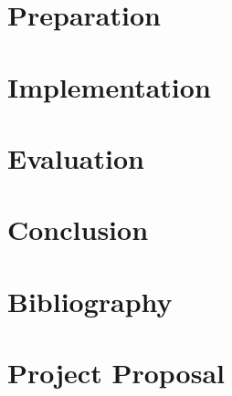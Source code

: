 \documentclass[12pt,twoside,notitlepage]{report}
\newcommand{\texas}{Texas Hold~`em\xspace}
\newcommand{\texasp}{\texas Poker\xspace}
\newcommand{\sbt}{SimpleBot\xspace}
\begin{document}
\cleardoublepage
\chapter{Preparation}



\cleardoublepage
\chapter{Implementation}



\cleardoublepage
\chapter{Evaluation}



\cleardoublepage
\chapter{Conclusion}




\cleardoublepage
\chapter*{Bibliography}


\cleardoublepage


\appendix

%


%

\cleardoublepage

\chapter{Project Proposal}

\end{document}
